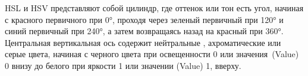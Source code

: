 \begin{figure}[ht!]
\end{figure}

\begin{figure}[ht!]
\end{figure}

HSL и HSV представляют собой цилиндр, где оттенок или тон есть угол, начиная с красного первичного при 0°, проходя через зеленый первичный при 120° и синий первичный при 240°, а затем возвращаясь назад на красный при 360°. Центральная вертикальная ось содержит нейтральные , ахроматические или серые цвета, начиная с черного цвета при освещенности 0 или значения (Value) 0 внизу до белого при яркости 1 или значении (Value) 1, вверху.

